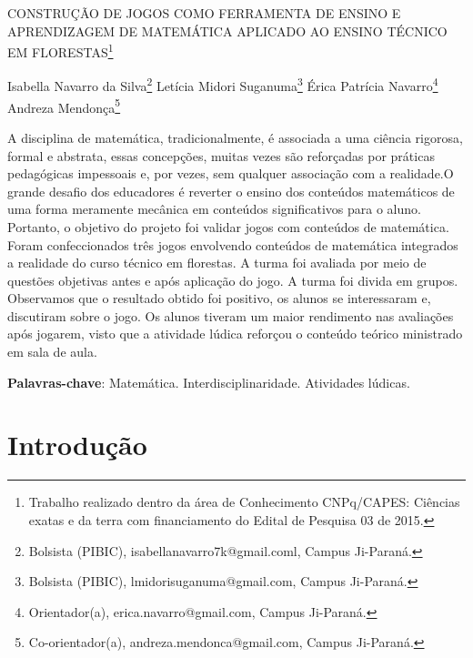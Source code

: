 \documentclass[article,12pt,onesidea,4paper,english,brazil]{abntex2}
\begin{document}
	
	
	\frenchspacing 
	
	\begin{center}
		\LARGE CONSTRUÇÃO DE JOGOS COMO FERRAMENTA DE ENSINO E APRENDIZAGEM DE MATEMÁTICA APLICADO AO ENSINO TÉCNICO EM FLORESTAS\footnote{Trabalho realizado dentro da área de Conhecimento CNPq/CAPES: Ciências exatas e da terra com financiamento do Edital de Pesquisa 03 de 2015.}
		
		\normalsize
		Isabella Navarro da Silva\footnote{Bolsista (PIBIC), isabellanavarro7k@gmail.coml, Campus Ji-Paraná.} 
		Letícia Midori Suganuma\footnote{Bolsista (PIBIC), lmidorisuganuma@gmail.com, Campus Ji-Paraná.} 
	Érica Patrícia Navarro\footnote{Orientador(a), erica.navarro@gmail.com, Campus Ji-Paraná.} 
		Andreza Mendonça\footnote{Co-orientador(a), andreza.mendonca@gmail.com, Campus Ji-Paraná.} 
	\end{center}
	
	\begin{resumoumacoluna}
	A disciplina de matemática, tradicionalmente, é associada a uma ciência rigorosa, formal e abstrata, essas concepções, muitas vezes são reforçadas por práticas pedagógicas impessoais e, por vezes, sem qualquer associação com a realidade.O grande desafio dos educadores é reverter o ensino dos conteúdos matemáticos de uma forma meramente mecânica em conteúdos significativos para o aluno. Portanto, o objetivo do projeto foi validar jogos com conteúdos de matemática. Foram confeccionados três jogos envolvendo conteúdos de matemática integrados a realidade do curso técnico em florestas. A turma foi avaliada por meio de questões objetivas antes e após aplicação do jogo. A turma foi divida em grupos. Observamos que o resultado obtido foi positivo, os alunos se interessaram e, discutiram sobre o jogo. Os alunos tiveram um maior rendimento nas avaliações após jogarem, visto que a atividade lúdica reforçou o conteúdo teórico ministrado em sala de aula.
		
		\vspace{\onelineskip}
		
		\noindent
		\textbf{Palavras-chave}: Matemática. Interdisciplinaridade. Atividades lúdicas.
	\end{resumoumacoluna}
	
	\section*{Introdução}
	
\end{document}
